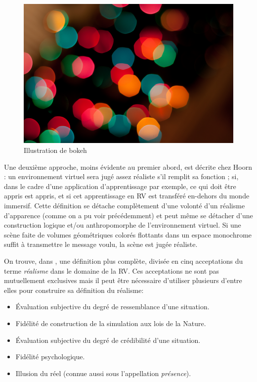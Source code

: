 	\begin{figure}[h]
		\centering
		\includegraphics[scale=.75]{Figures/BokehIllustration}
		\caption{Illustration de bokeh}
		\label{fig:bokeh_illustration}
	\end{figure}
	
	\par Une deuxième approche, moins évidente au premier abord, est décrite chez Hoorn \citep{hoorn_virtual_2003}: un environnement virtuel sera jugé assez réaliste s'il remplit sa fonction ; si, dans le cadre d'une application d'apprentissage par exemple, ce qui doit être appris est appris, et si cet apprentissage en RV est transféré en-dehors du monde immersif. Cette définition se détache complètement d'une volonté d'un réalisme d'apparence (comme on a pu voir précédemment) et peut même se détacher d'une construction logique et/ou anthropomorphe de l'environnement virtuel. Si une scène faite de volumes géométriques colorés flottants dans un espace monochrome suffit à transmettre le message voulu, la scène est jugée réaliste.
	
	\par On trouve, dans \citep{fuchs_traite_2003}, une définition plus complète, divisée en cinq acceptations du terme \textit{réalisme} dans le domaine de la RV. Ces acceptations ne sont pas mutuellement exclusives mais il peut être nécessaire d'utiliser plusieurs d'entre elles pour construire sa définition du réalisme:
	\begin{itemize}
		\item Évaluation subjective du degré de ressemblance d'une situation.
		\item Fidélité de construction de la simulation aux lois de la Nature.
		\item Évaluation subjective du degré de crédibilité d'une situation.
		\item Fidélité psychologique.
		\item Illusion du réel (connue aussi sous l'appellation \textit{présence}).
	\end{itemize}
	
